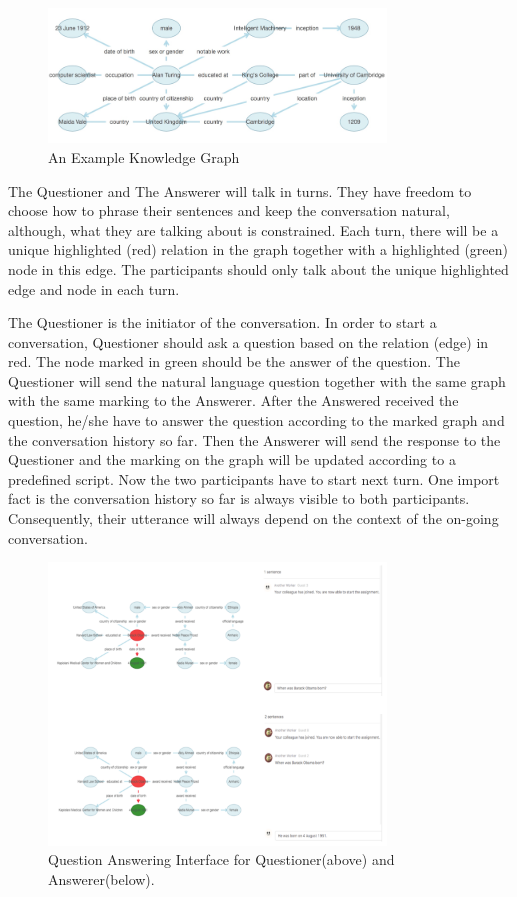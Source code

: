 \documentclass[bsc,frontabs,twoside,singlespacing,parskip,deptreport]{infthesis}     %
\begin{document}
\begin{figure}[h]
    \centering
    \includegraphics[width=0.80\textwidth]{kg.png}
    \caption{An Example Knowledge Graph}
    \label{fig:kg}
\end{figure}


The Questioner and The Answerer will talk in turns. They have freedom to choose how to phrase their sentences and keep the conversation natural, although, what they are talking about is constrained. Each turn, there will be a unique highlighted (red) relation in the graph together with a highlighted (green) node in this edge. The participants should only talk about the unique highlighted edge and node in each turn.

The Questioner is the initiator of the conversation. In order to start a conversation, Questioner should ask a question based on the relation (edge) in red. The node marked in green should be the answer of the question. The Questioner will send the natural language question together with the same graph with the same marking to the Answerer. After the Answered received the question, he/she have to answer the question according to the marked graph and the conversation history so far. Then the Answerer will send the response to the Questioner and the marking on the graph will be updated according to a predefined script. Now the two participants have to start next turn. One import fact is the conversation history so far is always visible to both participants. Consequently, their utterance will always depend on the context of the on-going conversation.

\begin{figure}[h]
    \centering
    \includegraphics[width=0.8\textwidth]{qa1.png}
    \caption{Question Answering Interface for Questioner(above) and Answerer(below).}
    \label{fig:kgjson}
\end{figure}
\end{document}
